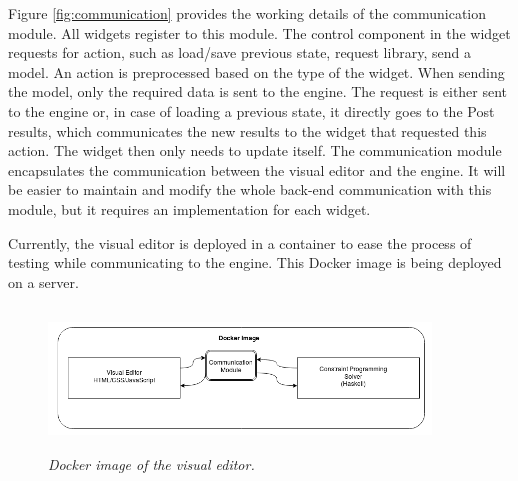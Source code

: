 \documentclass[a4paper]{article}
\begin{document}
Figure \ref{fig:communication} provides the working details of the communication module. All widgets register to this module. The control component in the widget requests for action, such as load/save previous state, request library, send a model. An action is preprocessed based on the type of the widget. When sending the model, only the required data is sent to the engine. The request is either sent to the engine or, in case of loading a previous state, it directly goes to the Post results, which communicates the new results to the widget that requested this action. The widget then only needs to update itself. The communication module encapsulates the communication between the visual editor and the engine. It will be easier to maintain and modify the whole back-end communication with this module, but it requires an implementation for each widget.

Currently, the visual editor is deployed in a container to ease the process of testing while communicating to the engine. This Docker image is being deployed on a server.

\begin{figure}
\begin{center}
\includegraphics[height=1.5in,width=4in]{img/e2e.png}
\caption{\small \sl Docker image of the visual editor.\label{fig:e2e}}
\end{center}
\end{figure}
\end{document}

